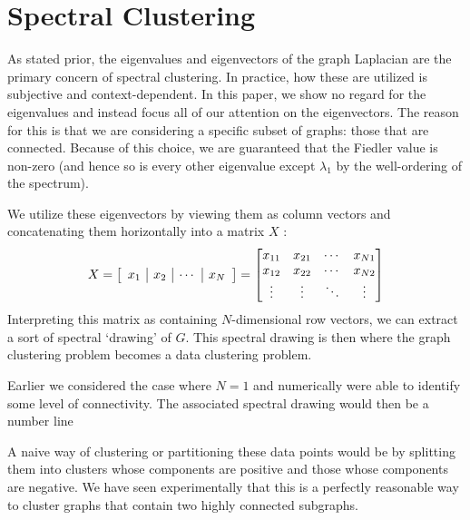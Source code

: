 \documentclass[11pt, letterpaper]{article}
\theoremstyle{perchance}
\begin{document}
\section{Spectral Clustering}\label{sec:spec}

    As stated prior, the eigenvalues and eigenvectors of the graph Laplacian are the primary concern of spectral clustering. In practice, how these are utilized is subjective and context-dependent. In this paper, we show no regard for the eigenvalues and instead focus all of our attention on the eigenvectors. The reason for this is that we are considering a specific subset of graphs: those that are connected. Because of this choice, we are guaranteed that the Fiedler value is non-zero (and hence so is every other eigenvalue except $\lambda_1$ by the well-ordering of the spectrum).

    We utilize these eigenvectors by viewing them as column vectors and concatenating them horizontally into a matrix $X$ \cite{wikispec}:
    \[X = \left[\begin{array}{c | c | c | c} x_1 & x_2 & \cdots & x_{N} \end{array}\right] = \begin{bmatrix}
        x_{11} & x_{21} & \cdots & x_{N1} \\
        x_{12} & x_{22} & \cdots & x_{N2} \\
        \vdots & \vdots & \ddots & \vdots
    \end{bmatrix}\]
    Interpreting this matrix as containing $N$-dimensional row vectors, we can extract a sort of spectral `drawing' of $G$. This spectral drawing is then where the graph clustering problem becomes a data clustering problem. 
    
    Earlier we considered the case where $N = 1$ and numerically were able to identify some level of connectivity. The associated spectral drawing would then be a number line
    \begin{center}
    \end{center}
    A naive way of clustering or partitioning these data points would be by splitting them into clusters whose components are positive and those whose components are negative. We have seen experimentally that this is a perfectly reasonable way to cluster graphs that contain two highly connected subgraphs. 
\end{document}
